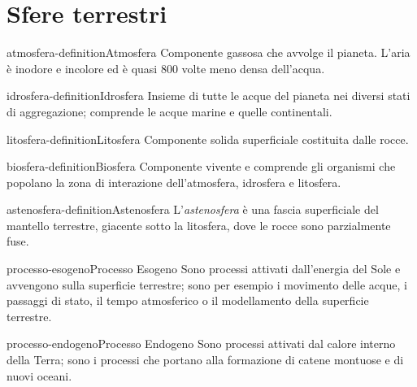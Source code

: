 \documentclass[preview]{standalone}
\begin{document}
\genpage

\section{Sfere terrestri}


\begin{snippetdefinition}{atmosfera-definition}{Atmosfera}
    Componente gassosa che avvolge il pianeta. L'aria è inodore e incolore ed è quasi 800 volte meno densa dell'acqua.
\end{snippetdefinition}

\begin{snippetdefinition}{idrosfera-definition}{Idrosfera}
    Insieme di tutte le acque del pianeta nei diversi stati di aggregazione; comprende le acque marine e quelle continentali.
\end{snippetdefinition}
    
\begin{snippetdefinition}{litosfera-definition}{Litosfera}
    Componente solida superficiale costituita dalle rocce.
\end{snippetdefinition}

\begin{snippetdefinition}{biosfera-definition}{Biosfera}
    Componente vivente e comprende gli organismi che popolano la zona di interazione dell'atmosfera, idrosfera e litosfera.
\end{snippetdefinition}

\begin{snippetdefinition}{astenosfera-definition}{Astenosfera}
    L'\textit{astenosfera} è una fascia superficiale del mantello terrestre, giacente sotto la litosfera,
    dove le rocce sono parzialmente fuse.
\end{snippetdefinition}

\begin{snippetdefinition}{processo-esogeno}{Processo Esogeno}
    Sono processi attivati dall'energia del Sole e avvengono sulla superficie terrestre; sono per esempio i movimento delle acque, i passaggi di stato, il tempo atmosferico o il modellamento della superficie terrestre.
\end{snippetdefinition}

\begin{snippetdefinition}{processo-endogeno}{Processo Endogeno}
    Sono processi attivati dal calore interno della Terra; sono i processi che portano alla formazione di catene montuose e di nuovi oceani.
\end{snippetdefinition}
\end{document}
